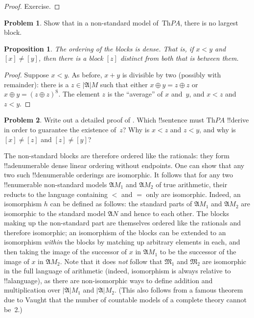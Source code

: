 \documentclass[10pt,a4paper]{article}
\makeatletter
\theoremstyle{plain}
\newtheorem{prop}[thm]{Proposition}
\theoremstyle{definition}
\newtheorem{prob}{Problem}[section]
\theoremstyle{remark}
\newenvironment{explain}{}{}
\newcommand*{\ollabel}[1]{\label{#1}}
\newcommand{\olref}{\@ifnextchar[{\olref@i}{\olref@final}}
\def\olref@i[#1]{\@ifnextchar[{\olref@ii}{\olref@final}}
\def\olref@ii[#1]{\@ifnextchar[{\olref@iii}{\olref@final}}
\def\olref@iii[#1]{\olref@final}
\def\olref@final#1{\ref{#1}}
\providecommand{\Struct}{\ensuremath{\mathfrak{A}}}
\providecommand{\Domain}{\ensuremath{|\mathfrak{A}|}}
\providecommand{\Th}{\ensuremath{\mathrm{Th}}}
\providecommand{\nssucc}{\mathrm{S}}
\providecommand{\nsplus}{\mathbin{+}}
\providecommand{\nsless}{<}
\makeatother
\begin{document}
\begin{proof}
Exercise.
\end{proof}

\begin{prob}
Show that in a non-standard model of~$\Th{PA}$, there is no largest
block.
\end{prob}

\begin{prop}
\ollabel{prop:blocks-dense}
The ordering of the blocks is dense. That is, if $x \nsless y$ and
$[x] \neq [y]$, then there is a block $[z]$ distinct from both that is
between them.
\end{prop}

\begin{proof}
Suppose $x \nsless y$. As before, $x \nsplus y$ is divisible by two
(possibly with remainder): there is a $z \in \Domain{M}$ such that
either $x \oplus y = z \oplus z$ or $x \oplus y = (z \oplus
z)^\nssucc$. The element $z$ is the ``average'' of $x$ and~$y$, and $x
\nsless z$ and $z \nsless y$.
\end{proof}

\begin{prob}
Write out a detailed proof of
\olref[mod][mar][mpa]{prop:blocks-dense}. Which !!{sentence} must
$\Th{PA}$ !!{derive} in order to guarantee the existence of~$z$? Why
is $x \nsless z$ and $z \nsless y$, and why is $[x] \neq [z]$ and $[z]
\neq [y]$?
\end{prob}

\begin{explain}
The non-standard blocks are therefore ordered like the rationals: they
form !!a{denumerable} dense linear ordering without endpoints.  One can show
that any two such !!{denumerable} orderings are isomorphic. It follows
that for any two !!{enumerable} non-standard models $\Struct{M}_1$ and
$\Struct{M_2}$ of true arithmetic, their reducts to the language
containing $<$ and $=$ only are isomorphic. Indeed, an isomorphism $h$
can be defined as follows: the standard parts of $\Struct{M_1}$ and
$\Struct{M_2}$ are isomorphic to the standard model $\Struct{N}$ and
hence to each other. The blocks making up the non-standard part are
themselves ordered like the rationals and therefore isomorphic; an
isomorphism of the blocks can be extended to an isomorphism
\emph{within} the blocks by matching up arbitrary elements in each,
and then taking the image of the successor of $x$ in $\Struct{M_1}$ to
be the successor of the image of $x$ in $\Struct{M_2}$. Note that it
does \emph{not} follow that $\mathfrak{M}_1$ and $\mathfrak{M}_2$ are
isomorphic in the full language of arithmetic (indeed, isomorphism is
always relative to !!a{language}), as there are non-isomorphic ways to
define addition and multiplication over $\Domain{M_1}$ and
$\Domain{M_2}$. (This also follows from a famous theorem due to Vaught
that the number of countable models of a complete theory cannot be~2.)
\end{explain}
\end{document}
